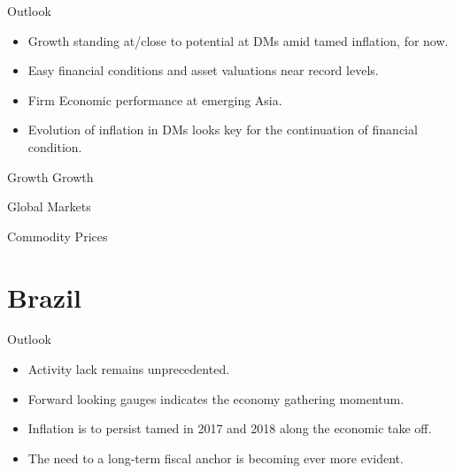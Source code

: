 \documentclass[12pt, presentation, t]{beamer}
\begin{document}
\begin{frame}[label={sec:org240869e}]{Outlook}
\begin{itemize}
\item Growth standing at/close to potential at DMs amid tamed inflation, for now.
\item Easy financial conditions and asset valuations near record levels.
\item Firm Economic performance at emerging Asia.
\item Evolution of inflation in DMs looks key for the continuation of
financial condition.
\end{itemize}
\end{frame}

\begin{frame}[label={sec:org4e49ed9}]{Growth Growth}
\end{frame}
\begin{frame}[label={sec:org7d9516e}]{Global Markets}
\end{frame}

\begin{frame}[label={sec:orgff0f9b5}]{Commodity Prices}
\end{frame}

\section{Brazil}
\label{sec:org677ccf0}

\begin{frame}[label={sec:org1ecbbad}]{Outlook}
\begin{itemize}
\item Activity lack remains unprecedented.
\item Forward looking gauges indicates the economy gathering momentum.
\item Inflation is to persist tamed in 2017 and 2018 along the economic take off.
\item The need to a long-term fiscal anchor is becoming ever more
evident.
\end{itemize}
\end{frame}
\end{document}
